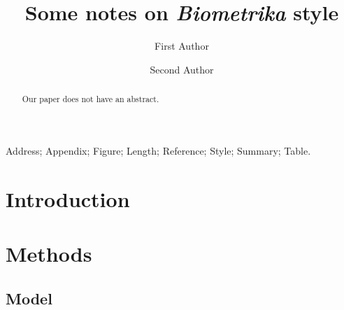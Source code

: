 \documentclass[lineno]{biometrika}
\begin{document}



\title{Some notes on \textit{Biometrika} style}

\author{First Author}

\author{Second Author}



\maketitle

\begin{abstract}
Our paper does not have an abstract. 
\end{abstract}

\begin{keywords}
Address; Appendix; Figure; Length; Reference; Style; Summary; Table.
\end{keywords}

\section{Introduction}

\lipsum[1-2]


\section{Methods}

\lipsum[3]


\subsection{Model}
\end{document}
